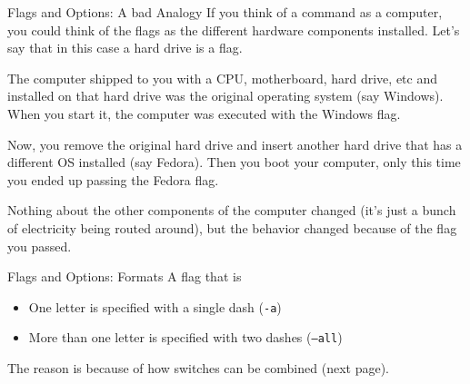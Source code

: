 \begin{frame}[fragile]{Flags and Options: A bad Analogy}
  If you think of a command as a computer, you could think of the flags as the different
  hardware components installed.  Let's say that in this case a hard drive is a flag.

  The computer shipped to you with a CPU, motherboard, hard drive, etc and installed on that hard drive
  was the original operating system (say Windows).  When you start it, the computer was executed with the Windows flag.

  Now, you remove the original hard drive and insert another hard drive that has a different OS installed
  (say Fedora).  Then you boot your computer, only this time you ended up passing the Fedora flag.

  Nothing about the other components of the computer changed (it's just a bunch of electricity being routed around),
  but the behavior changed because of the flag you passed.
\end{frame}

\begin{frame}[fragile]{Flags and Options: Formats}
  A flag that is
  \begin{itemize}
    \item One letter is specified with a single dash (\texttt{-a})
    \item More than one letter is specified with two dashes (\texttt{--all})
  \end{itemize}
  The reason is because of how switches can be combined (next page).
\end{frame}

